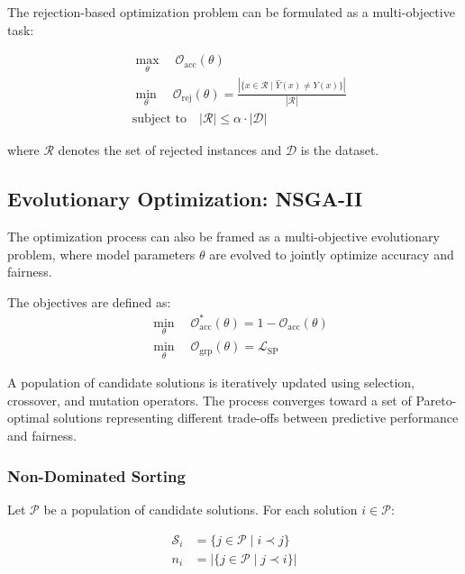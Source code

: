 \documentclass[12pt,a4paper]{article}
\begin{document}
The rejection-based optimization problem can be formulated as a multi-objective task:

\begin{align}
    &\max_{\theta} \quad \mathcal{O}_{\text{acc}}(\theta) \\
    &\min_{\theta} \quad \mathcal{O}_{\text{rej}}(\theta) = 
    \frac{|\{x \in \mathcal{R} \mid \hat{Y}(x) \neq Y(x)\}|}{|\mathcal{R}|} \\
    &\text{subject to} \quad |\mathcal{R}| \leq \alpha \cdot |\mathcal{D}|
\end{align}

where $\mathcal{R}$ denotes the set of rejected instances and $\mathcal{D}$ is the dataset.

\subsection{Evolutionary Optimization: NSGA-II}

The optimization process can also be framed as a multi-objective evolutionary problem, where model parameters $\theta$ are evolved to jointly optimize accuracy and fairness.

The objectives are defined as:
\begin{align}
    &\min_{\theta} \quad \mathcal{O}_{\text{acc}}^{*}(\theta) = 1 - \mathcal{O}_{\text{acc}}(\theta) \\
    &\min_{\theta} \quad \mathcal{O}_{\text{grp}}(\theta) = \mathcal{L}_{\text{SP}}
\end{align}

A population of candidate solutions is iteratively updated using selection, crossover, and mutation operators. The process converges toward a set of Pareto-optimal solutions representing different trade-offs between predictive performance and fairness.

\subsubsection{Non-Dominated Sorting}

Let $\mathcal{P}$ be a population of candidate solutions. For each solution $i \in \mathcal{P}$:

\begin{align}
    \mathcal{S}_i &= \{j \in \mathcal{P} \mid i \prec j\} \\
    n_i &= |\{j \in \mathcal{P} \mid j \prec i\}|
\end{align}
\end{document}
